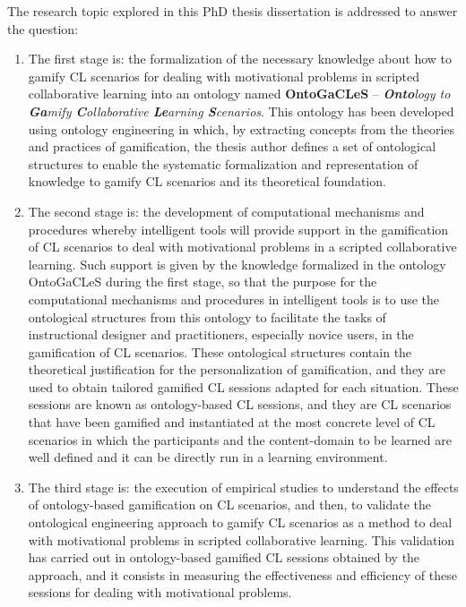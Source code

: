
The research topic explored in this PhD thesis dissertation is addressed to answer the question:



\begin{enumerate}
\item
The first stage is: the formalization of the necessary knowledge about how to gamify CL scenarios for dealing with motivational problems in scripted collaborative learning into an ontology named \textbf{OntoGaCLeS} – \emph{\textbf{Onto}logy to \textbf{Ga}mify \textbf{C}ollaborative \textbf{Le}arning \textbf{S}cenarios}.
This ontology has been developed using ontology engineering in which, by extracting concepts from the theories and practices of gamification, the thesis author defines a set of ontological structures to enable the systematic formalization and representation of knowledge to gamify CL scenarios and its theoretical foundation.

\item
The second stage is: the development of computational mechanisms and procedures whereby intelligent tools will provide support in the gamification of CL scenarios to deal with motivational problems in a scripted collaborative learning.
Such support is given by the knowledge formalized in the ontology OntoGaCLeS during the first stage, so that the purpose for the computational mechanisms and procedures in intelligent tools is to use the ontological structures from this ontology to facilitate the tasks of instructional designer and practitioners, especially novice users, in the gamification of CL scenarios.
These ontological structures contain the theoretical justification for the personalization of gamification, and they are used to obtain tailored gamified CL sessions adapted for each situation.
These sessions are known as ontology-based CL sessions, and they are CL scenarios that have been gamified and instantiated at the most concrete level of CL scenarios in which the participants and the content-domain to be learned are well defined and it can be directly run in a learning environment.

\item
The third stage is: the execution of empirical studies to understand the effects of ontology-based gamification on CL scenarios, and then, to validate the ontological engineering approach to gamify CL scenarios as a method to deal with motivational problems in scripted collaborative learning.
This validation has carried out in ontology-based gamified CL sessions obtained by the approach, and it consists in measuring the effectiveness and efficiency of these sessions for dealing with motivational problems.
\end{enumerate}

